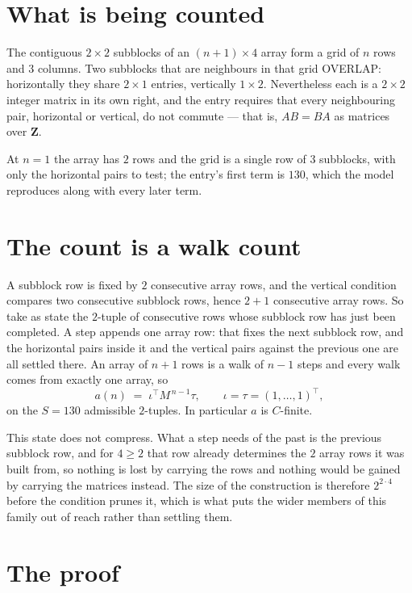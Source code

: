 \documentclass[11pt,a4paper]{article}
\theoremstyle{plain}
\theoremstyle{definition}
\begin{document}
\section{What is being counted}

The contiguous $2\times2$ subblocks of an $(n+1)\times4$ array form a grid of $n$
rows and $3$ columns. Two subblocks that are neighbours in that
grid OVERLAP: horizontally they share $2\times1$ entries, vertically
$1\times2$. Nevertheless each is a $2\times2$ integer matrix in its own right, and
the entry requires that every neighbouring pair, horizontal or vertical, do not commute --- that is,
$AB=BA$ as matrices over $\mathbf{Z}$.

At $n=1$ the array has $2$ rows and the grid is a single row of $3$
subblocks, with only the horizontal pairs to test; the entry's first term is
$130$, which the model reproduces along with every later term.

\section{The count is a walk count}

A subblock row is fixed by $2$ consecutive array rows, and the vertical condition compares
two consecutive subblock rows, hence $2+1$ consecutive array rows. So take as state the
$2$-tuple of consecutive rows whose subblock row has just been completed. A step appends one
array row: that fixes the next subblock row, and the horizontal pairs inside it and the
vertical pairs against the previous one are all settled there. An array of $n+1$ rows is
a walk of $n-1$ steps and every walk comes from exactly one array, so
\[
a(n)\;=\;\iota^{\!\top}M^{\,n-1}\tau,\qquad\iota=\tau=(1,\dots,1)^{\!\top},
\]
on the $S=130$ admissible $2$-tuples. In particular $a$ is $C$-finite.

This state does not compress. What a step needs of the past is the previous subblock row, and
for $4\ge2$ that row already determines the $2$ array rows it was built from, so nothing
is lost by carrying the rows and nothing would be gained by carrying the matrices instead. The
size of the construction is therefore $2^{2\cdot4}$ before the condition prunes
it, which is what puts the wider members of this family out of reach rather than settling them.

\section{The proof}
\end{document}
